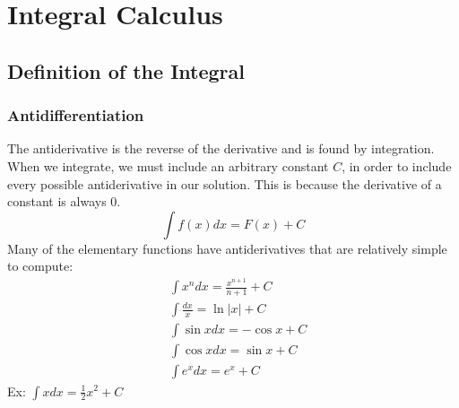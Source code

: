 \documentclass[11pt, fleqn]{article}
\begin{document}



\section{Integral Calculus}
\subsection{Definition of the Integral}
\subsubsection{Antidifferentiation}
The antiderivative is the reverse of the derivative and is found by integration. When we integrate, we must include an arbitrary constant $C$, in order to include every possible antiderivative in our solution. This is because the derivative of a constant is always 0.
$$\int f(x)dx=F(x)+C$$
Many of the elementary functions have antiderivatives that are relatively simple to compute:
\begin{align*}
    &\int x^ndx=\frac{x^{n+1}}{n+1}+C\\
    &\int \frac{dx}{x}=\ln|x|+C\\
    &\int \sin{x} dx=-\cos x+C\\
    &\int \cos{x} dx=\sin x+C\\
    &\int e^xdx=e^x+C
\end{align*}
Ex: $\int xdx=\frac{1}{2}x^2+C$\\
\end{document}
